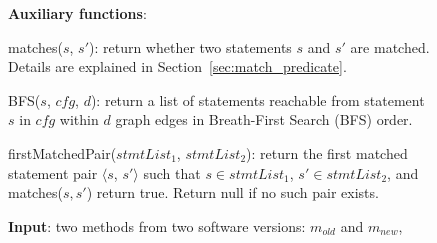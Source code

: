 \begin{figure}[t]
\textbf{Auxiliary functions}:

matches($\mathit{s}$, $\mathit{s'}$): return whether two statements
$\mathit{s}$ and $\mathit{s'}$ are matched. Details are explained
in Section~\ref{sec:match_predicate}.

BFS($\mathit{s}$, $\mathit{cfg}$, $\mathit{d}$): return a list of statements reachable from statement
$\mathit{s}$ in $\mathit{cfg}$ within $\mathit{d}$ graph edges in Breath-First Search (BFS) order.

firstMatchedPair($\mathit{stmtList_1}$, $\mathit{stmtList_2}$): return the first matched statement pair $\langle$$\mathit{s}$, $\mathit{s'}$$\rangle$ such that $\mathit{s} \in \mathit{stmtList_1}$, $\mathit{s'} \in \mathit{stmtList_2}$, and matches($\mathit{s}, \mathit{s'}$) return true. Return null if no such pair exists.

\vspace{1mm}

\textbf{Input}: two methods from two software versions: $\mathit{m_{old}}$ and $m_{new}$,


\end{figure}
